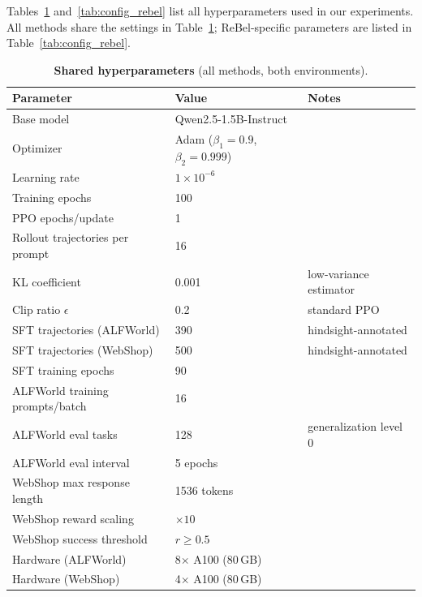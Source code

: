
Tables~\ref{tab:config_shared} and~\ref{tab:config_rebel} list all hyperparameters
used in our experiments.
All methods share the settings in Table~\ref{tab:config_shared}; ReBel-specific
parameters are listed in Table~\ref{tab:config_rebel}.

\begin{table}[h]
  \centering
  \caption{\textbf{Shared hyperparameters} (all methods, both environments).}
  \label{tab:config_shared}
  \vspace{4pt}
  \small
  \renewcommand{\arraystretch}{1.2}
  \begin{tabular}{@{}lll@{}}
    \toprule
    \textbf{Parameter} & \textbf{Value} & \textbf{Notes} \\
    \midrule
    Base model          & Qwen2.5-1.5B-Instruct & \citep{qwen2.5} \\
    Optimizer           & Adam ($\beta_1{=}0.9$, $\beta_2{=}0.999$) & \\
    Learning rate       & $1 \times 10^{-6}$ & \\
    Training epochs     & 100 & \\
    PPO epochs/update   & 1 & \\
    Rollout trajectories per prompt & 16 & \\
    KL coefficient      & 0.001 & low-variance estimator \\
    Clip ratio $\epsilon$ & 0.2 & standard PPO \\
    SFT trajectories (ALFWorld) & 390 & hindsight-annotated \\
    SFT trajectories (WebShop)  & 500 & hindsight-annotated \\
    SFT training epochs & 90 & \\
    ALFWorld training prompts/batch & 16 & \\
    ALFWorld eval tasks & 128 & generalization level 0 \\
    ALFWorld eval interval & 5 epochs & \\
    WebShop max response length & 1536 tokens & \\
    WebShop reward scaling & $\times 10$ & \\
    WebShop success threshold & $r \geq 0.5$ & \\
    Hardware (ALFWorld) & 8$\times$ A100 (80\,GB) & \\
    Hardware (WebShop)  & 4$\times$ A100 (80\,GB) & \\
    \bottomrule
  \end{tabular}
\end{table}

